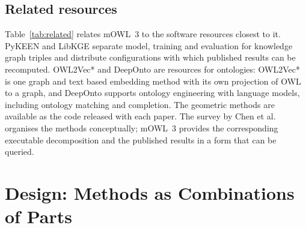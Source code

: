 \documentclass[runningheads]{llncs}
\begin{document}
\subsection{Related resources}

Table~\ref{tab:related} relates mOWL~3 to the software resources closest to it. PyKEEN
and LibKGE separate model, training and evaluation for knowledge graph triples and
distribute configurations with which published results can be recomputed. OWL2Vec* and DeepOnto are
resources for ontologies: OWL2Vec* is one graph and text based embedding method with its
own projection of OWL to a graph, and DeepOnto supports ontology engineering with
language models, including ontology matching and completion. The geometric methods are
available as the code released with each paper. The survey by Chen et
al.~\cite{chen2025} organises the methods conceptually; mOWL~3 provides the corresponding
executable decomposition and the published results in a form that can be queried.

\begin{table}[t]
\caption{Software resources for embeddings of knowledge graphs and ontologies. ``Parts''
states which components of a method can be exchanged independently.}\label{tab:related}
\centering\footnotesize\setlength{\tabcolsep}{4pt}
\end{table}

\section{Design: Methods as Combinations of Parts}
\end{document}
